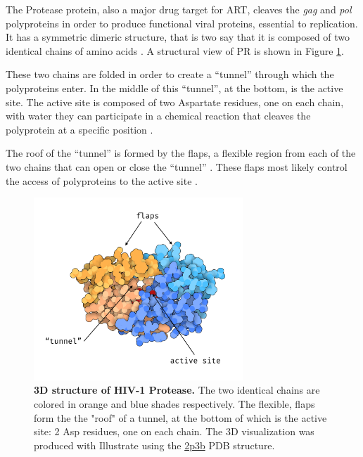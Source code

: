 \documentclass[
  11pt,
  twoside,
  BCOR=10mm,
  listof=totoc]{scrbook}
\newcommand{\extcaption}[2]{
    \caption[#1]{
        \textbf{#1}\newline
        #2
    }
}
\begin{document}
The Protease protein, also a major drug target for ART, cleaves the \emph{gag} and \emph{pol} polyproteins in order to produce functional viral proteins, essential to replication. It has a symmetric dimeric structure, that is two say that it is composed of two identical chains of amino acids \autocite{pearlStructuralModelRetroviral1987,gulnikHIVProteaseEnzyme2000}. A structural view of PR is shown in Figure \ref{fig:prStruct}.

These two chains are folded in order to create a ``tunnel'' through which the polyproteins enter. In the middle of this ``tunnel'', at the bottom, is the active site. The active site is composed of two Aspartate residues, one on each chain, with water they can participate in a chemical reaction that cleaves the polyprotein at a specific position \autocite{silvaInhibitionCatalyticMechanism1996}.

The roof of the ``tunnel'' is formed by the flaps, a flexible region from each of the two chains that can open or close the ``tunnel'' \autocite{hornakHIV1ProteaseFlaps2006}. These flaps most likely control the access of polyproteins to the active site \autocite{freedbergRapidStructuralFluctuations2002,yuStructuralInsightsHIV12017}.

\begin{figure} 
  \centering 
  \includegraphics[width=0.7\textwidth]{./figures/HIV-Intro/pr.png}      \extcaption{3D structure of HIV-1 Protease.}{The two identical chains are colored in orange and blue shades respectively. The flexible, flaps form the the "roof" of a tunnel, at the bottom of which is the active site: 2 Asp residues, one on each chain. The 3D visualization was produced with Illustrate \autocite{goodsellIllustrateSoftwareBiomolecular2019} using the \href{https://www.rcsb.org/structure/2P3B}{2p3b} PDB structure.}       
  \label{fig:prStruct} 
\end{figure}
\end{document}
